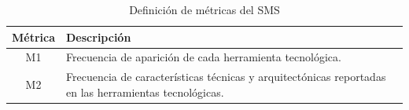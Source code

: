 \begin{table}[H]
	\centering
	\caption{Definición de métricas del \acs{SMS}}
	\label{tab:metricas}

	\renewcommand{\arraystretch}{1.2}
	\fontsize{9pt}{10pt}\selectfont

	\begin{tabularx}{\textwidth}{|c|X|}
		\hline
		\tableheader
		\textbf{Métrica} &
		\textbf{Descripción}
		\\
		\hline
		M1               &
		Frecuencia de aparición de cada herramienta tecnológica.
		\\
		\hline
		M2               &
		Frecuencia de características técnicas y arquitectónicas reportadas en las herramientas tecnológicas.
		\\
		\hline
	\end{tabularx}
\end{table}

